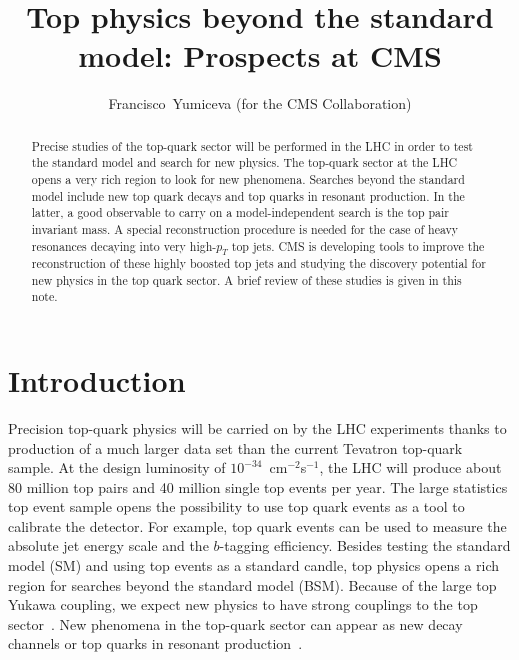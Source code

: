 \documentclass{cimento}
\title{Top physics beyond the standard model: Prospects at CMS}
\author{Francisco~Yumiceva (for the CMS Collaboration)\from{ins:x}}
\begin{document}
\maketitle

\begin{abstract}
Precise studies of the top-quark sector will be performed in the LHC
in order to test the standard model and search for new physics.
The top-quark sector at the LHC opens a very rich region to look for new 
phenomena. Searches beyond the standard model include new top quark 
decays 
and top quarks in resonant production. In the latter, a good observable to carry on a 
model-independent 
search is the top pair invariant mass. A special reconstruction
procedure is needed for the case of heavy resonances decaying into very
high-$p_{T}$ top jets. 
CMS is developing tools to improve 
the reconstruction of these highly boosted top jets and studying the discovery potential for new physics in the top quark sector. A brief review of these studies
is given in this note.
\end{abstract}

\section{Introduction}
\label{sec:Intro}

Precision top-quark physics will be carried on by the LHC experiments
thanks to production of a much larger data set than the current Tevatron top-quark sample.
At the design luminosity of $10^{-34}$~cm$^{-2}$s$^{-1}$, the LHC will
produce about 80 million top pairs and 40 million single top events per
year. The large statistics top event sample opens the possibility to use top quark
events as a tool to calibrate the detector. For example, top quark events
can be used to measure the absolute jet energy scale and 
the $b$-tagging efficiency. Besides testing the standard model (SM) and using top
events as a standard candle, top physics opens a rich region for searches
beyond the standard model (BSM). Because of the large top Yukawa coupling,
we expect new physics to have strong couplings to the top sector~\cite{ref:Wang}.
New phenomena in the top-quark sector can appear as new
decay channels or top quarks in resonant production~\cite{ref:Han}.
\end{document}
